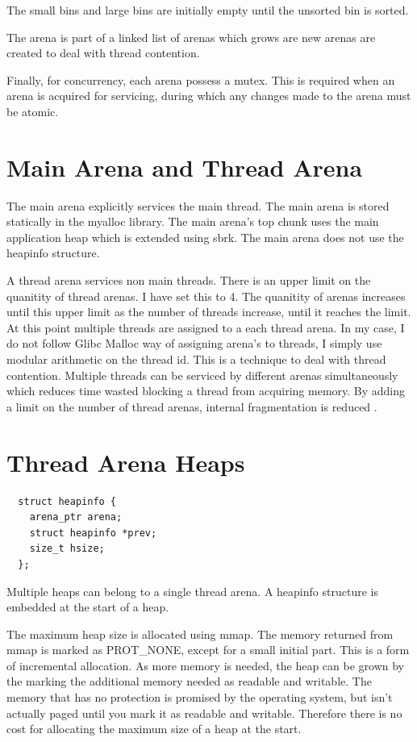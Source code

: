 \documentclass{article}
\begin{document}
The small bins and large bins are initially empty until the unsorted bin is sorted.

The arena is part of a linked list of arenas which grows are new arenas are created to deal with thread contention.

Finally, for concurrency, each arena possess a mutex. This is required when an arena is acquired for servicing, during which any changes made to the arena must be atomic.

\section{Main Arena and Thread Arena}

The main arena explicitly services the main thread. The main arena is stored statically in the myalloc library. The main arena's top chunk uses the main application heap which is extended using sbrk. The main arena does not use the heapinfo structure.

A thread arena services non main threads. There is an upper limit on the quanitity of thread arenas. I have set this to 4. The quanitity of arenas increases until this upper limit as the number of threads increase, until it reaches the limit. At this point multiple threads are assigned to a each thread arena. In my case, I do not follow Glibc Malloc way of assigning arena's to threads, I simply use modular arithmetic on the thread id. This is a technique to deal with thread contention. Multiple threads can be serviced by different arenas simultaneously which reduces time wasted blocking a thread from acquiring memory. By adding a limit on the number of thread arenas, internal fragmentation is reduced \cite{mallocinternals}.

\section{Thread Arena Heaps}

\begin{lstlisting}
  struct heapinfo {
    arena_ptr arena;
    struct heapinfo *prev;
    size_t hsize;
  };
\end{lstlisting}

Multiple heaps can belong to a single thread arena. A heapinfo structure is embedded at the start of a heap. 

The maximum heap size is allocated using mmap. The memory returned from mmap is marked as PROT\_NONE, except for a small initial part. This is a form of incremental allocation. As more memory is needed, the heap can be grown by the marking the additional memory needed as readable and writable. The memory that has no protection is promised by the operating system, but isn't actually paged until you mark it as readable and writable. Therefore there is no cost for allocating the maximum size of a heap at the start. 
\end{document}
